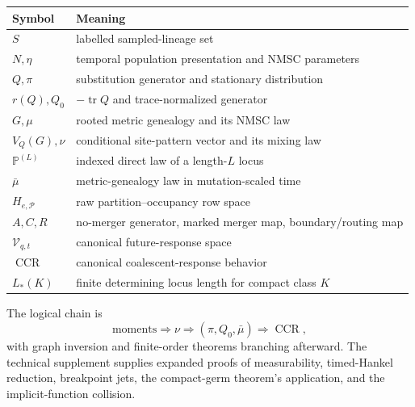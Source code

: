 \documentclass[11pt]{article}
\newcommand{\CCR}{\operatorname{CCR}}
\newcommand{\tr}{\operatorname{tr}}
\newcommand{\cP}{\mathcal P}
\newcommand{\cV}{\mathcal V}
\begin{document}
\begin{longtable}{@{}p{}p{}@{}}
\toprule
Symbol & Meaning \\
\midrule
$S$ & labelled sampled-lineage set \\
$N,\eta$ & temporal population presentation and NMSC parameters \\
$Q,\pi$ & substitution generator and stationary distribution \\
$r(Q),Q_0$ & $-\tr Q$ and trace-normalized generator \\
$G,\mu$ & rooted metric genealogy and its NMSC law \\
$V_Q(G),\nu$ & conditional site-pattern vector and its mixing law \\
$\mathbb P^{(L)}$ & indexed direct law of a length-$L$ locus \\
$\bar\mu$ & metric-genealogy law in mutation-scaled time \\
$H_{e,\cP}$ & raw partition--occupancy row space \\
$A,C,R$ & no-merger generator, marked merger map, boundary/routing map \\
$\cV_{q,t}$ & canonical future-response space \\
$\CCR$ & canonical coalescent-response behavior \\
$L_*(K)$ & finite determining locus length for compact class $K$ \\
\bottomrule
\end{longtable}

The logical chain is
\[
\text{moments}
\Rightarrow \nu
\Rightarrow (\pi,Q_0,\bar\mu)
\Rightarrow \CCR,
\]
with graph inversion and finite-order theorems branching afterward.  The technical supplement supplies expanded proofs of measurability, timed-Hankel reduction, breakpoint jets, the compact-germ theorem's application, and the implicit-function collision.



\end{document}
